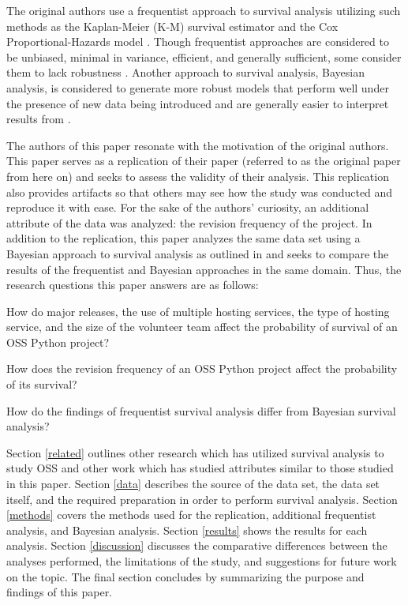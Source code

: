 \documentclass[acmconf]{acmart}
\begin{document}
The original authors use a frequentist approach to survival analysis utilizing such methods as the Kaplan-Meier (K-M) survival estimator and the Cox Proportional-Hazards model \cite{kaplan1958nonparametric, cox1972regression}.
Though frequentist approaches are considered to be unbiased, minimal in variance, efficient, and generally sufficient, some consider them to lack robustness \cite{renganathan2016overview}. Another approach to survival analysis, Bayesian analysis, is considered to generate more robust models that perform well under the presence of new data being introduced and are generally easier to interpret results from \cite{renganathan2016overview}.

The authors of this paper resonate with the motivation of the original authors. 
This paper serves as a replication of their paper \cite{ali2020cheating} (referred to as the original paper from here on) and seeks to assess the validity of their analysis.
This replication also provides artifacts so that others may see how the study was conducted and reproduce it with ease.
For the sake of the authors' curiosity, an additional attribute of the data was analyzed: the revision frequency of the project.
In addition to the replication, this paper analyzes the same data set using a Bayesian approach to survival analysis as outlined in \cite{kelter2020bayesian} and seeks to compare the results of the frequentist and Bayesian approaches in the same domain.
Thus, the research questions this paper answers are as follows:

\begin{questions}
    \item How do major releases, the use of multiple hosting services, the type of hosting service, and the size of the volunteer team affect the probability of survival of an OSS Python project?
    \item How does the revision frequency of an OSS Python project affect the probability of its survival?
    \item How do the findings of frequentist survival analysis differ from Bayesian survival analysis?
\end{questions}

Section \ref{related} outlines other research which has utilized survival analysis to study OSS and other work which has studied attributes similar to those studied in this paper.
Section \ref{data} describes the source of the data set, the data set itself, and the required preparation in order to perform survival analysis.
Section \ref{methods} covers the methods used for the replication, additional frequentist analysis, and Bayesian analysis.
Section \ref{results} shows the results for each analysis.
Section \ref{discussion} discusses the comparative differences between the analyses performed, the limitations of the study, and suggestions for future work on the topic.
The final section concludes by summarizing the purpose and findings of this paper.
\end{document}
